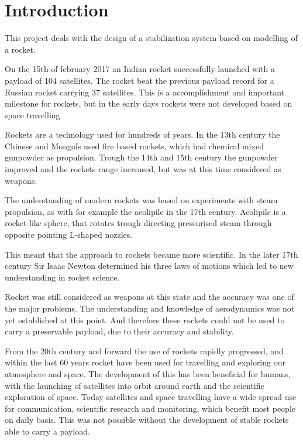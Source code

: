 \chapter{Introduction}\label{sec:Introduction}
This project deals with the design of a stabilization system based on modelling of a rocket.

On the 15th of february 2017 an Indian rocket successfully launched with a payload of 104 satellites. The rocket beat the previous payload record for a Russian rocket carrying 37 satellites. This is a accomplishment and important milestone for rockets, but in the early days rockets were not developed based on space travelling.

Rockets are a technology used for hundreds of years. In the 13th century the Chinese and Mongols used fire based rockets, which had chemical mixed gunpowder as propulsion. Trough the 14th and 15th century the gunpowder improved and the rockets range increased, but was at this time considered as weapons.  

The understanding of modern rockets was based on experiments with steam propulsion, as with for example the aeolipile in the 17th century. Aeolipile is a rocket-like sphere, that rotates trough directing pressurised steam through opposite pointing L-shaped nozzles\cite{web:HistoryRocket}. 

This meant that the approach to rockets became more scientific. In the later 17th century Sir Isaac Newton determined his three laws of motions which led to new understanding in rocket science.

Rocket was still considered as weapons at this state and the accuracy was one of the major problems. The understanding and knowledge of aerodynamics was not yet established at this point. And therefore these rockets could not be used to carry a preservable payload, due to their accuracy and stability. 


From the 20th century and forward the use of rockets rapidly progressed, and within the last 60 years rocket have been used for travelling and exploring our atmosphere and space. The development of this has been beneficial for humans, with the launching of satellites into orbit around earth and the scientific exploration of space. Today satellites and space travelling have a wide spread use for communication, scientific research and monitoring, which benefit most people on daily basis. This was not possible without the development of stable rockets able to carry a payload\cite{web:HistoryRocket}.


